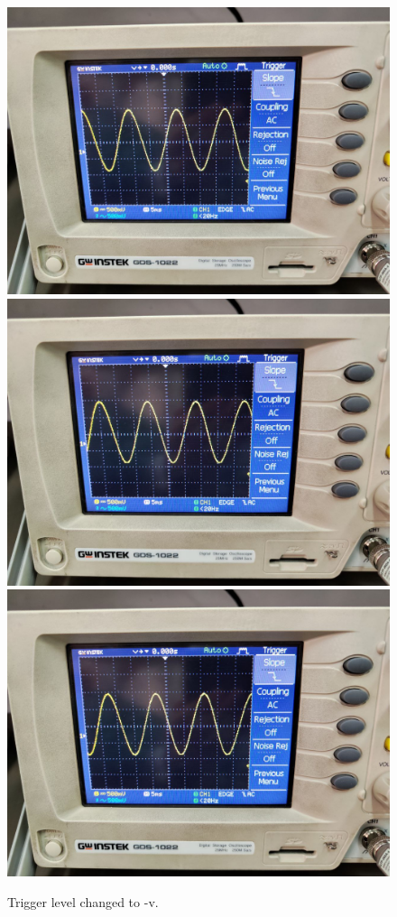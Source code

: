 \documentclass[11pt]{article}
\begin{document}
\begin{question}
{        \begin{figure}[H]
            \begin{center}
                \includegraphics[scale=0.1]{Fig/56.jpeg}
                \includegraphics[scale=0.1]{Fig/57.jpeg}
                \includegraphics[scale=0.1]{Fig/58.jpeg}
                \caption{Trigger level changed to -v.}
            \end{center}
        \end{figure}

}
\end{question}
\end{document}
